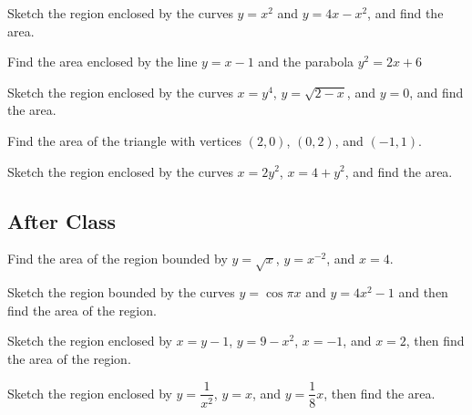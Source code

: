 \documentclass[notes]{subfiles}
\begin{document}
		
		\begin{ex}
			Sketch the region enclosed by the curves $y = x^2$ and $y = 4x-x^2$, and find the area.
		\end{ex}	

			\newpage
			
		\begin{ex}
			Find the area enclosed by the line $y = x-1$ and the parabola $y^2=2x+6$
		\end{ex}
			\newpage
			
		\begin{ex}
			Sketch the region enclosed by the curves $x = y^4$, $y=\sqrt{2-x}$, and $y = 0$, and find the area.
		\end{ex}

			
			
		\begin{ex}
			Find the area of the triangle with vertices $(2,0)$, $(0,2)$, and $(-1,1)$.
		\end{ex}	
			\newpage
			
		\begin{ex}
			Sketch the region enclosed by the curves $x = 2y^2$, $x = 4+y^2$, and find the area.
		\end{ex}

		
			\newpage
	
	\subsection*{After Class}	
		\begin{ex}
			Find the area of the region bounded by $y = \sqrt{x}$, $y = x^{-2}$, and $x = 4$.
		\end{ex}
			
		\begin{ex}
			Sketch the region bounded by the curves $y = \cos \pi x$ and $y = 4x^2 - 1$ and then find the area of the region.
		\end{ex}

		
			\newpage
			
		\begin{ex}
			Sketch the region enclosed by $x = y - 1$, $y = 9-x^2$, $x = -1$, and $x = 2$, then find the area of the region.
		\end{ex}
			
		\begin{ex}
			Sketch the region enclosed by $y = \dfrac{1}{x^2}$, $y = x$, and $y = \dfrac{1}{8}x$, then find the area.
		\end{ex}
		
	\clearpage
\end{document}
